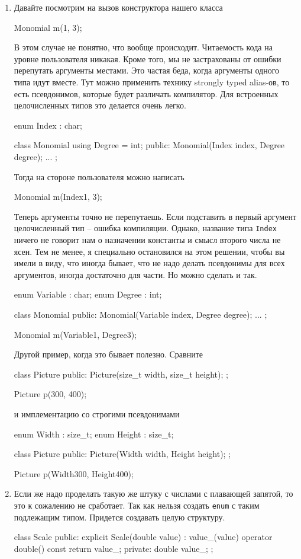 \begin{enumerate}
\item
\label{item::CtorArgs}
Давайте посмотрим на вызов конструктора нашего класса
\begin{cppcode}
Monomial m(1, 3);
\end{cppcode}
В этом случае не понятно, что вообще происходит.
Читаемость кода на уровне пользователя никакая.
Кроме того, мы не застрахованы от ошибки перепутать аргументы местами.
Это частая беда, когда аргументы одного типа идут вместе.
Тут можно применить технику strongly typed alias-ов, то есть псевдонимов, которые будет различать компилятор.
Для встроенных целочисленных типов это делается очень легко.
\begin{cppcode}
enum Index : char;

class Monomial {
  using Degree = int;
public:
  Monomial(Index index, Degree degree);
  ...
};
\end{cppcode}
Тогда на стороне пользователя можно написать
\begin{cppcode}
Monomial m(Index{1}, 3);
\end{cppcode}
Теперь аргументы точно не перепутаешь.
Если подставить в первый аргумент целочисленный тип -- ошибка компиляции.
Однако, название типа \verb"Index" ничего не говорит нам о назначении константы и смысл второго числа не ясен.
Тем не менее, я специально остановился на этом решении, чтобы вы имели в виду, что иногда бывает, что не надо делать псевдонимы для всех аргументов, иногда достаточно для части.
Но можно сделать и так.
\begin{cppcode}
enum Variable : char;
enum Degree : int;

class Monomial {
public:
  Monomial(Variable index, Degree degree);
  ...
};

Monomial m(Variable{1}, Degree{3});
\end{cppcode}
Другой пример, когда это бывает полезно.
Сравните
\begin{cppcode}
class Picture {
public:
  Picture(size_t width, size_t height);
};

Picture p(300, 400);
\end{cppcode}
и имплементацию со строгими псевдонимами
\begin{cppcode}
enum Width : size_t;
enum Height : size_t;

class Picture {
public:
  Picture(Width width, Height height);
};

Picture p(Width{300}, Height{400});
\end{cppcode}

\item Если же надо проделать такую же штуку с числами с плавающей запятой, то это к сожалению не сработает.
Так как нельзя создать \verb"enum" с таким подлежащим типом.
Придется создавать целую структуру.
\begin{cppcode}
class Scale {
public:
  explicit Scale(double value) : value_(value) {
  }
  operator double() const {
    return value_;
  }
private:
  double value_;
};


\end{cppcode}
\end{enumerate}
